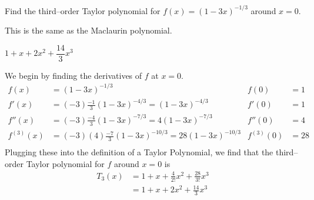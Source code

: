 \begin{question}[2006H]
Find the third--order Taylor polynomial for
$f(x)=(1 - 3x)^{-1/3}$ around $x = 0$.
\end{question}
\begin{hint}
This is the same as the Maclaurin polynomial.
\end{hint}
\begin{answer}
$1 + x +2x^2+\dfrac{14}{3}x^3$
\end{answer}
\begin{solution}
We begin by finding the derivatives of $f$ at $x=0$.
\begin{align*} f(x)&=(1 - 3x)^{-1/3} & f(0) & = 1 \\
 f'(x)&=(-3)\frac{-1}{3}(1 - 3x)^{-4/3}=(1-3x)^{-4/3} & f'(0) & = 1 \\
 f''(x)&=(-3)\frac{-4}{3}(1-3x)^{-7/3}={4}(1 - 3x)^{-7/3} & f''(0) & = 4 \\
 f^{(3)}(x)&=(-3)(4)\frac{-7}{3}(1-3x)^{-10/3}=28(1 - 3x)^{-10/3} & f^{(3)}(0) & = 28 \\
\end{align*}
Plugging these into the definition of a Taylor Polynomial, we find that the third--order Taylor polynomial for $f$ around $x = 0$ is
\begin{align*}
T_3(x)&=1+x+\frac{4}{2!}x^2+\frac{28}{3!}x^3\\
&=1 + x +2x^2+\frac{14}{3}x^3
\end{align*}
\end{solution}



